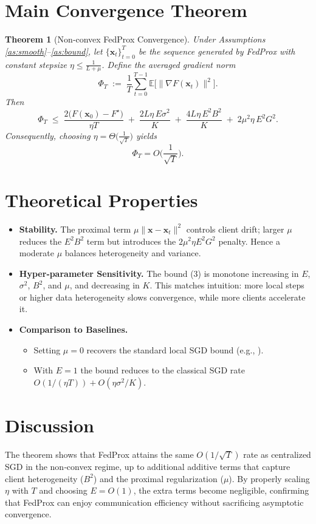 \documentclass{article}
\newtheorem{theorem}{Theorem}
\begin{document}
\section*{Main Convergence Theorem}
\begin{theorem}[Non‑convex FedProx Convergence]\label{thm:main}
Under Assumptions \ref{as:smooth}–\ref{as:bound}, let $\{ \mathbf{x}_t\}_{t=0}^{T}$ be the sequence generated by FedProx with constant stepsize 
$\eta\le \frac{1}{L+\mu}$. Define the averaged gradient norm
\[
\Phi_T\;:=\;\frac{1}{T}\sum_{t=0}^{T-1}\mathbb{E}\big[\|\nabla F(\mathbf{x}_t)\|^2\big].
\]
Then
\[
\boxed{
\Phi_T\;\le\;
\frac{2\big(F(\mathbf{x}_0)-F^\star\big)}{\eta T}
\;+\;
\frac{2L\eta\,E\sigma^2}{K}
\;+\;
\frac{4L\eta\,E^2 B^2}{K}
\;+\;
2\mu^2\eta\,E^2 G^2 .
}
\tag{3}
\]
Consequently, choosing $\eta = \Theta\!\big(\frac{1}{\sqrt{T}}\big)$ yields 
\[
\Phi_T = O\!\Big(\frac{1}{\sqrt{T}}\Big).
\]
\end{theorem}

\section*{Theoretical Properties}
\begin{itemize}
\item \textbf{Stability.} The proximal term $\mu\|\mathbf{x}-\mathbf{x}_t\|^2$ controls client drift; larger $\mu$ reduces the $E^2 B^2$ term but introduces the $2\mu^2\eta E^2 G^2$ penalty. Hence a moderate $\mu$ balances heterogeneity and variance.
\item \textbf{Hyper‑parameter Sensitivity.} The bound (3) is monotone increasing in $E$, $\sigma^2$, $B^2$, and $\mu$, and decreasing in $K$. This matches intuition: more local steps or higher data heterogeneity slows convergence, while more clients accelerate it.
\item \textbf{Comparison to Baselines.}
    \begin{itemize}
        \item Setting $\mu=0$ recovers the standard local SGD bound (e.g., \cite{stich2020local}).
        \item With $E=1$ the bound reduces to the classical SGD rate $O(1/(\eta T)) + O(\eta\sigma^2/K)$.
    \end{itemize}
\end{itemize}

\section*{Discussion}
The theorem shows that FedProx attains the same $O(1/\sqrt{T})$ rate as centralized SGD in the non‑convex regime, up to additional additive terms that capture client heterogeneity ($B^2$) and the proximal regularization ($\mu$). By properly scaling $\eta$ with $T$ and choosing $E=O(1)$, the extra terms become negligible, confirming that FedProx can enjoy communication efficiency without sacrificing asymptotic convergence.
\end{document}
